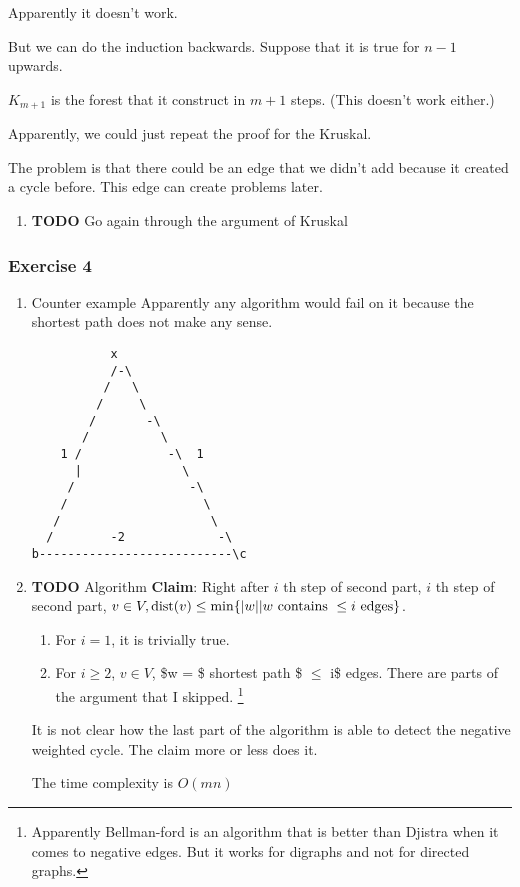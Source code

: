 \documentclass[11pt]{article}
\def\min{\operatorname{min}}
\def\dist{\operatorname{dist}}
\begin{document}
Apparently it doesn't work.

But we can do the induction backwards. Suppose that it is true for \(n-1\)
upwards.

\(K_{m+1}\) is the forest that it construct in \(m+1\) steps. (This doesn't work
either.)

Apparently, we could just repeat the proof for the Kruskal.

The problem is that there could be an edge that we didn't add because it
created a cycle before. This edge can create problems later.
\begin{enumerate}
\item {\bfseries\sffamily TODO} Go again through the argument of Kruskal
\label{sec:org7aa8923}
\end{enumerate}
\subsubsection{Exercise 4}
\label{sec:org88592f3}
\begin{enumerate}
\item Counter example
\label{sec:org764499d}
Apparently any algorithm would fail on it because the shortest path does
not make any sense.
\begin{verbatim}
           x
           /-\
          /   \
         /     \
        /       -\
       /          \
    1 /            -\  1       
      |              \        
     /                -\      
    /                   \     
   /                     \    
  /        -2             -\  
b---------------------------\c
\end{verbatim}
\item {\bfseries\sffamily TODO} Algorithm
\label{sec:org5ece058}
\textbf{Claim}: Right after \(i\) th step of second part, \(i\) th step of second
 part, \(v \in V, \dist(v) \le \min \{ \vert w\vert \vert w \textup{
      contains } \le i \textup{ edges} \}\).

\begin{enumerate}
\item For \(i=1\), it is trivially true.
\item For \(i\ge 2\), \(v \in V\), \$w = \$ shortest path \$ \(\le\) i\$ edges. There are
parts of the argument that I skipped. \footnote{Apparently Bellman-ford is an algorithm that is better than Djistra when
it comes to negative edges. But it works for digraphs and not for directed
graphs.}
\end{enumerate}

It is not clear how the last part of the algorithm is able to detect the
negative weighted cycle. The claim more or less does it.

The time complexity is \(O(mn)\)
\end{enumerate}
\end{document}

